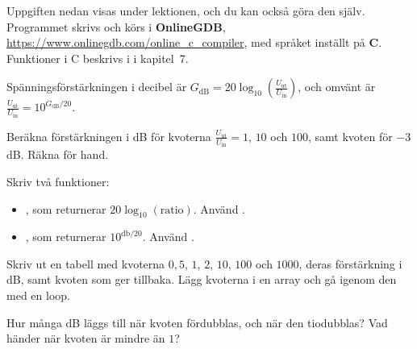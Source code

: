 Uppgiften nedan visas under lektionen, och du kan också göra den själv. Programmet skrivs och körs i
\textbf{OnlineGDB}, \url{https://www.onlinegdb.com/online_c_compiler}, med språket inställt på
\textbf{C}. Funktioner i C beskrivs i  i kapitel~7.

Spänningsförstärkningen i decibel är
$G_{\text{dB}} = 20\log_{10}\left(\frac{U_{\text{ut}}}{U_{\text{in}}}\right)$, och omvänt är
$\frac{U_{\text{ut}}}{U_{\text{in}}} = 10^{G_{\text{dB}}/20}$.
\begin{parts}
  \item Beräkna förstärkningen i dB för kvoterna $\frac{U_{\text{ut}}}{U_{\text{in}}} = 1$, $10$
    och $100$, samt kvoten för $-3$ dB. Räkna för hand.
  \item Skriv två funktioner:
    \begin{itemize}
      \item {}, som returnerar $20\log_{10}(\text{ratio})$.
        Använd .
      \item {}, som returnerar $10^{\text{db}/20}$. Använd
        .
    \end{itemize}
    Skriv ut en tabell med kvoterna $0{,}5$, $1$, $2$, $10$, $100$ och $1000$, deras förstärkning
    i dB, samt kvoten som  ger tillbaka. Lägg kvoterna i en array och gå
    igenom den med en loop.
  \item Hur många dB läggs till när kvoten fördubblas, och när den tiodubblas? Vad händer när
    kvoten är mindre än $1$?
\end{parts}
